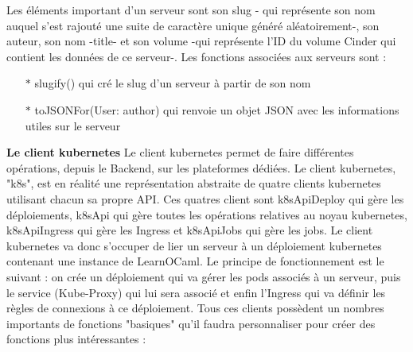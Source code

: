 \documentclass{article}
\begin{document}
Les éléments important d'un serveur sont son slug - qui représente son nom auquel s'est rajouté une suite de caractère unique généré aléatoirement-, son auteur, son nom -title- et son volume -qui représente l'ID du volume Cinder qui contient les données de ce serveur-.
\newline
Les fonctions associées aux serveurs sont :
\begin{itemize}
	\item[$\ast$]slugify() qui cré le slug d'un serveur à partir de son nom
	\item[$\ast$]toJSONFor(User: author) qui renvoie un objet JSON avec les informations utiles sur le serveur
\end{itemize}

\newpage

\textbf{Le client kubernetes}
\newline
\newline
Le client kubernetes permet de faire différentes opérations, depuis le Backend, sur les plateformes dédiées.
\newline
Le client kubernetes, "k8s", est en réalité une représentation abstraite de quatre clients kubernetes utilisant chacun sa propre API.
\newline
Ces quatres client sont k8sApiDeploy qui gère les déploiements, k8sApi qui gère toutes les opérations relatives au noyau kubernetes, k8sApiIngress qui gère les Ingress et k8sApiJobs qui gère les jobs.
\newline
Le client kubernetes va donc s'occuper de lier un serveur à un déploiement kubernetes contenant une instance de LearnOCaml.
\newline
Le principe de fonctionnement est le suivant : on crée un déploiement qui va gérer les pods associés à un serveur, puis le service (Kube-Proxy) qui lui sera associé et enfin l'Ingress qui va définir les règles de connexions à ce déploiement.
\newline
Tous ces clients possèdent un nombres importants de fonctions "basiques" qu'il faudra personnaliser pour créer des fonctions plus intéressantes :
\end{document}
